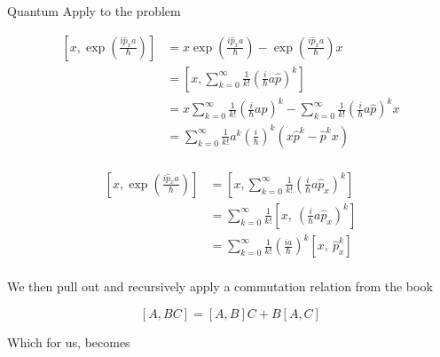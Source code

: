 \begin{answer}
\begin{answerpart}{Quantum}
    Apply to the problem
    
    \begin{equation}
      \begin{split}
        \left[x, \exp(\frac{i\hat{p}_xa}{\hbar})\right]
        &=
        x\exp(\frac{i\hat{p}_xa}{\hbar})
        -
        \exp(\frac{i\hat{p}_xa}{\hbar})x
        \\
        &=
          \left[x,
            \sum_{k=0}^\infty\frac{1}{k!}
            \left(\frac{i}{\hbar}a\hat{p}\right)^k
            \right]
        \\
        &=
        x
        \sum_{k=0}^\infty\frac{1}{k!}
        \left(\frac{i}{\hbar}a\hat{p}\right)^k
        -
        \sum_{k=0}^\infty\frac{1}{k!}
        \left(\frac{i}{\hbar}a\hat{p}\right)^k
        x
        \\
        &=
        \sum_{k=0}^\infty
        \frac{1}{k!}
        a^k
        \left(\frac{i}{\hbar}\right)^k
        \left(
        x\hat{p}^k
        -
        \hat{p}^kx
        \right)
        \\
      \end{split}
    \end{equation}

    \begin{equation}
      \begin{split}
        \left[x, \exp(\frac{i\hat{p}_xa}{\hbar})\right]
        &=
          \left[x,
            \sum_{k=0}^\infty\frac{1}{k!}
            \left(\frac{i}{\hbar}a\hat{p}_x\right)^k
            \right]
        \\
        &=
        \sum_{k=0}^{\infty}\frac{1}{k!}
        \left[
          x,\ 
          \left(\frac{i}{\hbar}a\hat{p}_x\right)^k
          \right]
        \\
        &=
        \sum_{k=0}^{\infty}\frac{1}{k!}
        \left(\frac{ia}{\hbar}\right)^k
        \left[
          x,\ 
          \hat{p}_x^k
          \right]
        \\
      \end{split}
    \end{equation}

    We then pull out and recursively apply a commutation relation from
    the book

    \begin{equation}
      \tag{1.232e}
      [A,BC] = [A,B]C + B[A,C]
    \end{equation}

    Which for us, becomes
    

\end{answerpart}
\end{answer}
